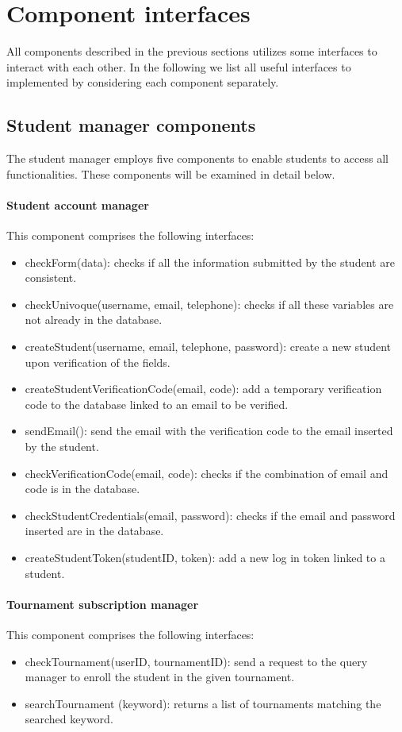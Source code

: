 \documentclass[12pt, a4paper]{report}
\begin{document}
    \section{Component interfaces}
    All components described in the previous sections utilizes some interfaces to interact with each other. 
    In the following we list all useful interfaces to implemented by considering each component separately. 

    \subsection{Student manager components}
    The student manager employs five components to enable students to access all functionalities. 
    These components will be examined in detail below.

    \paragraph*{Student account manager}
    This component comprises the following interfaces: 
    \begin{itemize}
        \item checkForm(data): checks if all the information submitted by the student are consistent. 
        \item checkUnivoque(username, email, telephone): checks if all these variables are not already in the database. 
        \item createStudent(username, email, telephone, password): create a new student upon verification of the fields. 
        \item createStudentVerificationCode(email, code): add a temporary verification code to the database linked to an email to be verified. 
        \item sendEmail(): send the email with the verification code to the email inserted by the student. 
        \item checkVerificationCode(email, code): checks if the combination of email and code is in the database. 
        \item checkStudentCredentials(email, password): checks if the email and password inserted are in the database. 
        \item createStudentToken(studentID, token): add a new log in token linked to a student. 
    \end{itemize}

    \paragraph*{Tournament subscription manager}
    This component comprises the following interfaces: 
    \begin{itemize}
        \item checkTournament(userID, tournamentID): send a request to the query manager to enroll the student in the given tournament. 
        \item searchTournament (keyword): returns a list of tournaments matching the searched keyword. 
    \end{itemize}
\end{document}
